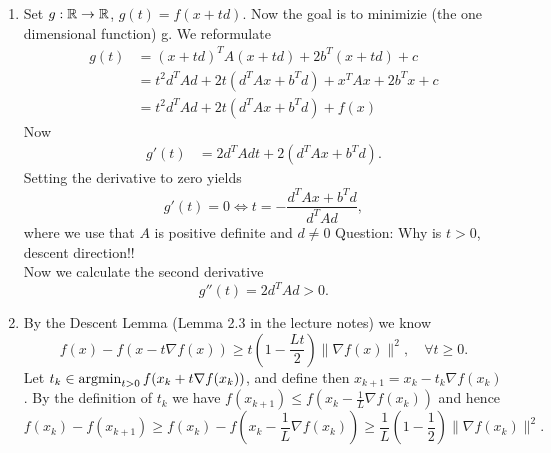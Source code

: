 \documentclass{ExerciseSheet}
\begin{document}
\begin{solution}
    \renewcommand{\labelenumi}{\alph{enumi})}

\begin{enumerate}
    \item Set $g:\mathbb{R} \rightarrow \mathbb{R}$, $g(t)=f(x+td)$. Now the goal is to minimizie (the one dimensional function) g. We reformulate
    \begin{align*}
        g(t) &= (x+td)^TA (x+td) + 2b^T(x+td) + c \\
        &= t^2d^TAd + 2t \left(d^TAx + b^Td\right) + x^TAx + 2b^Tx + c \\
        &=t^2d^TAd + 2t \left(d^TAx + b^Td\right) + f(x)
    \end{align*}
    Now 
    \begin{align*}
        g'(t)&= 2d^TAd t + 2\left(d^TAx + b^Td\right).
    \end{align*}
    Setting the derivative to zero yields
    \begin{equation}
        g'(t) = 0 \Leftrightarrow t = -\frac{d^TAx + b^Td}{d^TAd},
    \end{equation}
    where we use that $A$ is positive definite and $d\neq 0$
    Question: Why is $t>0$, descent direction!! \\ 
    Now we calculate the second derivative
    \begin{equation*}
        g''(t)=2d^TAd >0.
    \end{equation*}
    \item By the Descent Lemma (Lemma 2.3 in the lecture notes) we know
    \begin{equation*}
        f(x)-f(x-t\nabla f(x)) \geq t\left(1-\frac{Lt}{2}\right) \|\nabla f(x)\|^2, \quad \forall t\geq 0.
    \end{equation*}
    Let $t_k \in \operatorname*{argmin}_{t>0} f(x_k +t\nabla f(x_k))$, and define then $x_{k+1}=x_k - t_k \nabla f(x_k)$. By the definition of $t_k$ we have $f(x_{k+1})\leq f(x_k - \frac{1}{L}\nabla f(x_k))$ and hence
    \begin{equation*}
        f(x_k) - f(x_{k+1}) \geq f(x_k) - f(x_k - \frac{1}{L}\nabla f(x_k)) \geq \frac{1}{L}(1-\frac{1}{2}) \|\nabla f(x_k)\|^2.
    \end{equation*}
 \end{enumerate}
\end{solution}
\end{document}
